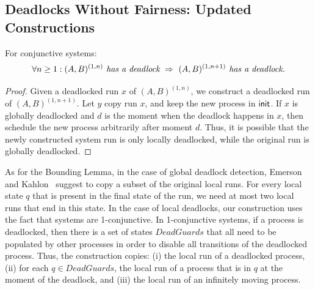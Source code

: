 \subsection{Deadlocks Without Fairness: Updated Constructions}\label{gua:sec:proofs-conj-deadlock-unfair}

\begin{lemma} \label{le:ConjunctiveMonotonicityLemmaDeadlocks}
For conjunctive systems:
$$
\forall n\geq 1: (A,B)^{(1,n)} \textit{ has a deadlock} 
\ \Impl\ 
(A,B)^{(1,n+1)} \textit{ has a deadlock.}
$$
\end{lemma}
\begin{proof}
Given a deadlocked run $x$ of $(A,B)^{(1,n)}$, we construct a deadlocked run of $(A,B)^{(1,n+1)}$.
Let $y$ copy run $x$, and keep the new process in ${\sf init}$.
If $x$ is globally deadlocked and $d$ is the moment when the deadlock happens in $x$,
then schedule the new process arbitrarily after moment $d$.
Thus, it is possible that the newly constructed system run is only locally deadlocked,
while the original run is globally deadlocked.
\end{proof}


As for the Bounding Lemma,
in the case of global deadlock detection, 
Emerson and Kahlon~\cite{Emerson00} suggest to copy a subset of the original local runs.
For every local state $q$ that is present in the final state of the run, 
we need at most two local runs that end in this state. 
In the case of local deadlocks, 
our construction uses the fact that systems are 1-conjunctive.
In 1-conjunctive systems, if a process is deadlocked, 
then there is a set of states $DeadGuards$ that all need to be populated by other processes
in order to disable all transitions of the deadlocked process. 
Thus, the construction copies: 
(i) the local run of a deadlocked process, 
(ii) for each $q \in DeadGuards$, the local run of a process 
     that is in $q$ at the moment of the deadlock, and
(iii) the local run of an infinitely moving process.

